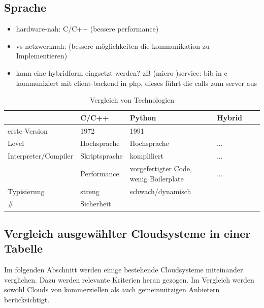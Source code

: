 \documentclass[a4paper,10pt]{article}
\numberwithin{figure}{section}
\numberwithin{table}{section}
\begin{document}
\cite{ArchitectingTheCloud}

\subsection{Sprache}

\begin{itemize}
 \item hardware-nah: C/C++ (bessere performance)
 \item vs netzwerknah: (bessere möglichkeiten die kommunikation zu Implementieren)
 \item kann eine hybridform eingsetzt werden?
 zB (micro-)service: bib in c kommuniziert mit client-backend in php, dieses führt die calls zum server aus
\end{itemize}

\begin{table}[H]
\centering
\caption{Vergleich von Technologien}
\label{my-label}
\renewcommand{\arraystretch}{1.5}
\begin{tabular}{llllll}
\hline
 & C/C++ & Python & Hybrid\\
\hline
erste Version & 1972 & 1991 & \\
Level & Hochsprache & Hochsprache & ...\\
Interpreter/Compiler & Skriptsprache & kompliliert & ...\\
 & Performance & vorgefertigter Code, wenig Boilerplate & ...\\
Typisierung & streng & schwach/dynamisch & \\
# & Sicherheit && \\
\hline
\end{tabular}
\end{table}

\subsection{Vergleich ausgewählter Cloudsysteme in einer Tabelle}

Im folgenden Abschnitt werden einige bestehende Cloudsysteme miteinander verglichen.
Dazu werden relevante Kriterien heran gezogen.
Im Vergleich werden sowohl Clouds von kommerziellen als auch gemeinnützigen Anbietern berücksichtigt.
\end{document}
